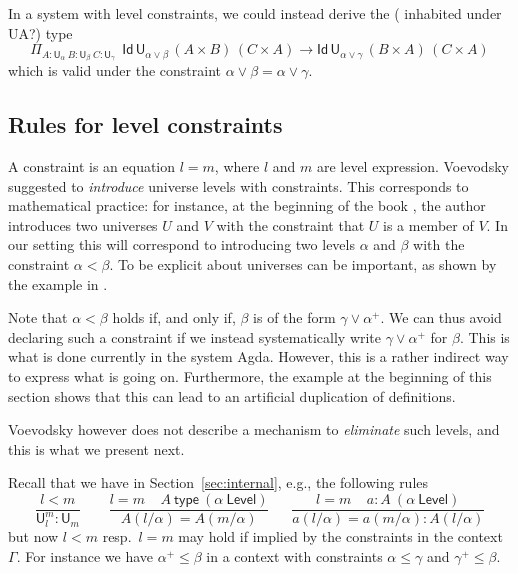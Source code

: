 \documentclass[11pt,a4paper]{article}
\theoremstyle{definition}
\newcommand{\Id}{\mathsf{Id}}
\newcommand{\UU}{\mathsf{U}}
\newcommand{\Level}{\mathsf{Level}}
\newcommand{\type}{\mathsf{type}}
\begin{document}
In a system with level constraints, 
we could instead derive the ({\color{red} inhabited under UA?}) type
$$
    \Pi_{A:\UU_\alpha~{B}:{\UU_\beta}~{C}:{\UU_\gamma}}
    {~~\Id\,\UU_{\alpha \vee \beta}\, (A\times B)\,(C \times A)
    \to \Id\,\UU_{\alpha \vee \gamma}\, (B\times A)\,(C \times A)}
$$
which is valid under the constraint
$
\alpha \vee \beta = \alpha \vee \gamma.
$

\subsection{Rules for level constraints}%

A constraint is an equation $l = m$, where $l$ and $m$ are level expression.
Voevodsky \cite{VV} suggested to {\em introduce} universe levels with constraints. This corresponds
to mathematical practice: for instance, at the beginning of the book \cite{giraud:cohom-non-abel},
the author introduces two universes $U$ and $V$ with the constraint that $U$ is a member of $V$.
In our setting this will correspond to introducing two levels $\alpha$ and $\beta$ with the
constraint $\alpha<\beta$. To be explicit about universes can be important, as shown by the
example in \cite{chambert-loir:universes-matter,waterhouse:sheaves}.

Note that $\alpha<\beta$ holds if, and only if, $\beta$ is of the form $\gamma\vee\alpha^+$. We can thus
avoid declaring such a constraint if we instead systematically write $\gamma\vee\alpha^+$ for $\beta$.
This is what is done currently in the system Agda. However, this is a rather indirect way to express what is
going on. Furthermore, the example at the beginning of this section shows that this can lead to an artificial duplication
of definitions.

Voevodsky however does not describe a mechanism to {\em eliminate}
such levels, and this is what we present next.

Recall that we have in Section~\ref{sec:internal}, e.g., the following rules
$$
\frac{l<m}{\UU^m_l:\UU_m}~~~~~~~~~
\frac{l=m ~~~~~ A~\type~(\alpha~\Level)}{A(l/\alpha) = A(m/\alpha)}
~~~~~~~
\frac{l=m ~~~~~ a:A~(\alpha~\Level)}{a(l/\alpha) = a(m/\alpha): A(l/\alpha)}
$$
but now $l<m$ resp.\ $l=m$ may hold if implied by the constraints 
in the context $\Gamma$.
For instance we have $\alpha^+\leqslant\beta$ in a context 
with constraints $\alpha\leqslant\gamma$ and $\gamma^+\leqslant\beta$.
\end{document}
